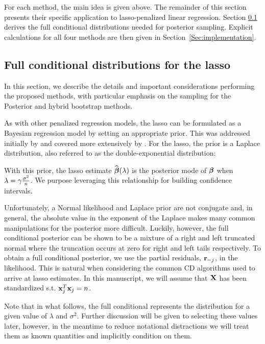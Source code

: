 For each method, the main idea is given above. The remainder of this section presents their specific application to lasso-penalized linear regression. Section \ref{Sec:full-cond} derives the full conditional distributions needed for posterior sampling. Explicit calculations for all four methods are then given in Section~\ref{Sec:implementation}.

\subsection{Full conditional distributions for the lasso}
\label{Sec:full-cond}


In this section, we describe the details and important considerations performing the proposed methods, with particular emphasis on the sampling for the Posterior and hybrid bootstrap methods.

As with other penalized regression models, the lasso can be formulated as a Bayesian regression model by setting an appropriate prior. This was addressed initially by \cite{Tibshirani1996} and covered more extensively by \cite{Park2008}. For the lasso, the prior is a Laplace distribution, also referred to as the double-exponential distribution:


With this prior, the lasso estimate $\widehat{\boldsymbol{\beta}}(\lambda)$ is the posterior mode of $\boldsymbol{\beta}$ when $\lambda = \gamma \frac{\sigma^2}{n}$. We purpose leveraging this relationship for building confidence intervals.

Unfortunately, a Normal likelihood and Laplace prior are not conjugate and, in general, the absolute value in the exponent of the Laplace makes many common manipulations for the posterior more difficult. Luckily, however, the full conditional posterior can be shown to be a mixture of a right and left truncated normal where the truncation occurs at zero for right and left tails respectively. To obtain a full conditional posterior, we use the partial residuals, $\mathbf{r}_{-j}$, in the likelihood. This is natural when considering the common CD algorithms used to arrive at lasso estimates. In this manuscript, we will assume that $\mathbf{X}$ has been standardized s.t. $\mathbf{x}_j^T\mathbf{x}_j = n$.

Note that in what follows, the full conditional represents the distribution for a given value of $\lambda$ and $\sigma^2$. Further discussion will be given to selecting these values later, however, in the meantime to reduce notational distractions we will treat them as known quantities and implicitly condition on them.

